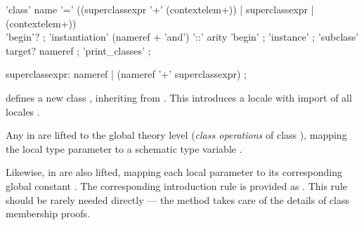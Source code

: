 \begin{isabellebody}
\begin{isamarkuptext}
  \begin{rail}
    'class' name '=' ((superclassexpr '+' (contextelem+)) | superclassexpr | (contextelem+)) \\
      'begin'?
    ;
    'instantiation' (nameref + 'and') '::' arity 'begin'
    ;
    'instance'
    ;
    'subclass' target? nameref
    ;
    'print\_classes'
    ;

    superclassexpr: nameref | (nameref '+' superclassexpr)
    ;
  \end{rail}

  \begin{descr}

  \item [\hyperlink{command.class}{\mbox{\isa{\isacommand{class}}}}~\isa{{\isachardoublequote}c\ {\isacharequal}\ superclasses\ {\isacharplus}\ body{\isachardoublequote}}] defines
  a new class , inheriting from .  This
  introduces a locale  with import of all locales .

  Any \hyperlink{element.fixes}{\mbox{}} in  are lifted to the global
  theory level (\emph{class operations}  of class ), mapping the local type parameter
  \isa{{\isasymalpha}} to a schematic type variable .

  Likewise, \hyperlink{element.assumes}{\mbox{}} in  are also lifted,
  mapping each local parameter  to its
  corresponding global constant .  The
  corresponding introduction rule is provided as .  This rule should be rarely needed directly
  --- the \hyperlink{method.intro_classes}{\mbox{}} method takes care of the details of
  class membership proofs.


\end{descr}
\end{isamarkuptext}
\end{isabellebody}

